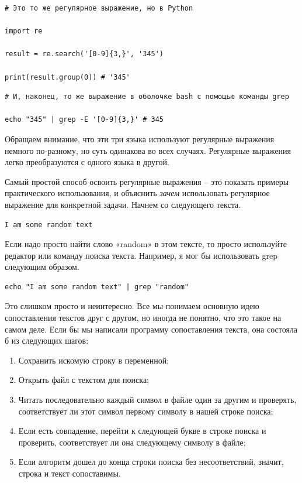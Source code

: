 \documentclass[12pt]{article}
\providecommand{\tightlist}{%
  \setlength{\itemsep}{0pt}\setlength{\parskip}{0pt}}
\begin{document}
\begin{verbatim}
# Это то же регулярное выражение, но в Python

import re

result = re.search('[0-9]{3,}', '345')

print(result.group(0)) # '345'
\end{verbatim}

\begin{verbatim}
# И, наконец, то же выражение в оболочке bash с помощью команды grep

echo "345" | grep -E '[0-9]{3,}' # 345
\end{verbatim}

Обращаем внимание, что эти три языка используют регулярные выражения
немного по-разному, но суть одинакова во всех случаях.
Регулярные выражения легко преобразуются с одного языка в другой.

Самый простой способ освоить регулярные выражения -- это показать примеры
практического использования, и объяснить \emph{зачем} использовать
регулярное выражение для конкретной задачи. Начнем со следующего текста.
\begin{verbatim}
I am some random text
\end{verbatim}

Если надо просто найти слово «random» в этом тексте, то просто
используйте редактор или команду поиска текста. Например, я мог бы
использовать grep следующим образом.
\begin{verbatim}
echo "I am some random text" | grep "random"
\end{verbatim}

Это слишком просто и неинтересно. Все мы понимаем основную идею
сопоставления текстов друг с другом, но иногда не понятно, что это такое
на самом деле. Если бы мы написали программу сопоставления текста, она
состояла б из следующих шагов:
\begin{enumerate}
\tightlist
\item
  Сохранить искомую строку в переменной;
\item
  Открыть файл с текстом для поиска;
\item
  Читать последовательно каждый символ в файле один за другим и
  проверять, соответствует ли этот символ первому символу в нашей строке
  поиска;
\item
  Если есть совпадение, перейти к следующей букве в строке поиска и
  проверить, соответствует ли она следующему символу в файле;
\item
  Если алгоритм дошел до конца строки поиска без несоответствий, значит,
  строка и текст сопоставимы.
\end{enumerate}
\end{document}
